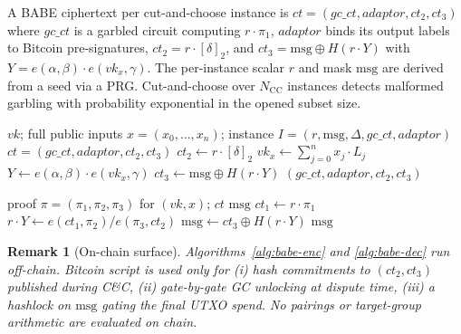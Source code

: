 \documentclass[11pt]{article}
\newtheorem{remark}{Remark}
\newcommand{\deltatwo}{[\delta]_2}
\newcommand{\msg}{\mathrm{msg}}
\newcommand{\Enc}{\mathsf{Enc}}
\newcommand{\Dec}{\mathsf{Dec}}
\begin{document}
A BABE ciphertext per cut-and-choose instance is
$ct = (gc\_ct, adaptor, ct_2, ct_3)$ where
$gc\_ct$ is a garbled circuit computing $r \cdot \pi_1$, $adaptor$
binds its output labels to Bitcoin pre-signatures, $ct_2 = r \cdot \deltatwo$,
and $ct_3 = \msg \oplus H(r \cdot Y)$ with
$Y = e(\alpha, \beta) \cdot e(vk_x, \gamma)$. The per-instance scalar
$r$ and mask $\msg$ are derived from a seed via a PRG. Cut-and-choose
over $N_{\mathrm{CC}}$ instances detects malformed garbling with
probability exponential in the opened subset size.

\begin{algorithm}[H]
\caption{BABE $\Enc(vk, x;\, I)$ \hfill{\footnotesize Verifier, off-chain, $T_0$}}
\label{alg:babe-enc}
\begin{algorithmic}[1]
\Require $vk$; full public inputs $x = (x_0, \ldots, x_n)$;
  instance $I = (r, \msg, \Delta, gc\_ct, adaptor)$
\Ensure $ct = (gc\_ct, adaptor, ct_2, ct_3)$
\State $ct_2 \gets r \cdot \deltatwo$
\State $vk_x \gets \sum_{j=0}^{n} x_j \cdot L_j$ 
\State $Y \gets e(\alpha, \beta) \cdot e(vk_x, \gamma)$
\State $ct_3 \gets \msg \oplus H(r \cdot Y)$
\State \Return $(gc\_ct, adaptor, ct_2, ct_3)$
\end{algorithmic}
\end{algorithm}

\begin{algorithm}[H]
\caption{BABE $\Dec(\pi, ct)$ \hfill{\footnotesize Prover, off-chain, $T_1$}}
\label{alg:babe-dec}
\begin{algorithmic}[1]
\Require proof $\pi = (\pi_1, \pi_2, \pi_3)$ for $(vk, x)$; $ct$
\Ensure $\msg$
\State $ct_1 \gets r \cdot \pi_1$ 
\State $r \cdot Y \gets e(ct_1, \pi_2) / e(\pi_3, ct_2)$ 
\State $\msg \gets ct_3 \oplus H(r \cdot Y)$
\State \Return $\msg$
\end{algorithmic}
\end{algorithm}

\begin{remark}[On-chain surface]
Algorithms~\ref{alg:babe-enc} and \ref{alg:babe-dec} run off-chain.
Bitcoin script is used only for (i) hash commitments to
$(ct_2, ct_3)$ published during C\&C, (ii) gate-by-gate GC unlocking
at dispute time, (iii) a hashlock on $\msg$ gating the final UTXO
spend. No pairings or target-group arithmetic are evaluated on chain.
\end{remark}

\end{document}
